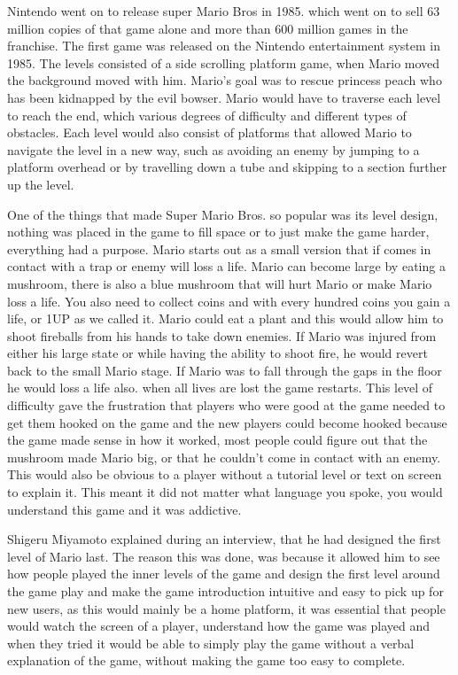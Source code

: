 \documentclass{article}
\begin{document}
Nintendo went on to release super Mario Bros in 1985. which went on to sell 63 million copies of that game alone and more than 600 million games in the franchise. The first game was released on the Nintendo entertainment system in 1985. The levels consisted of a side scrolling platform game, when Mario moved the background moved with him. Mario's goal was to rescue princess peach who has been kidnapped by the evil bowser. Mario would have to traverse each level to reach the end, which various degrees of difficulty and different types of obstacles. Each level would also consist of platforms that allowed Mario to navigate the level in a new way, such as avoiding an enemy by jumping to a platform overhead or by travelling down a tube and skipping to a section further up the level. \newline

One of the things that made Super Mario Bros. so popular was its level design, nothing was placed in the game to fill space or to just make the game harder, everything had a purpose. Mario starts out as a small version that if comes in contact with a trap or enemy will loss a life. Mario can become large by eating a mushroom, there is also a blue mushroom that will hurt Mario or make Mario loss a life. You also need to collect coins and with every hundred coins you gain a life, or 1UP as we called it.  Mario could eat a plant and this would allow him to shoot fireballs from his hands to take down enemies. If Mario was injured from either his large state or while having the ability to shoot fire, he would revert back to the small Mario stage. If Mario was to fall through the gaps in the floor he would loss a life also. when all lives are lost the game restarts. This level of difficulty gave the frustration that players who were good at the game needed to get them hooked on the game and the new players could become hooked because the game made sense in how it worked, most people could figure out that the mushroom made   Mario big, or that he couldn't come in contact with an enemy. This would also be obvious to a player without a tutorial level or text on screen to explain it. This meant it did not matter what language you spoke, you would understand this game and it was addictive. \newline 

Shigeru Miyamoto explained during an interview, that he had designed the first level of Mario last. The reason this was done, was because it allowed him to see how people played the inner levels of the game and design the first level around the game play and make the game introduction intuitive and easy to pick up for new users, as this would mainly be a home platform, it was essential that people would watch the screen of a player, understand how the game was played and when they tried it would be able to simply play the game without a verbal explanation of the game, without making the game too easy to complete.  \newline 
\end{document}
